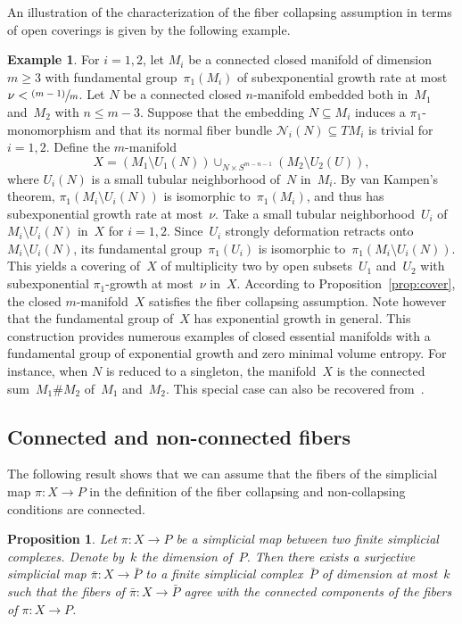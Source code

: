 \documentclass[11pt]{article}
\let\oldsfrac\sfrac
\renewcommand{\sfrac}[2]{{\oldsfrac{#1}{#2}}}
\newcommand{\psfrac}[2]{\sfrac{(#1)}{#2}}
\newtheorem{proposition}[theorem]{Proposition}
\theoremstyle{definition}
\newtheorem{example}[theorem]{Example}
\numberwithin{equation}{section}
\begin{document}
An illustration of the characterization of the fiber collapsing assumption in terms of open coverings is given by the following example.

\begin{example}
For $i=1,2$, let $M_i$ be a connected closed manifold of dimension~$m \geq 3$ with fundamental group~$\pi_1(M_i)$ of subexponential growth rate at most~$\nu < \psfrac{m-1}{m}$.
Let $N$ be a connected closed $n$-manifold embedded both in~$M_1$ and~$M_2$ with $n \leq m-3$.
Suppose that the embedding $N \subseteq M_i$ induces a $\pi_1$-monomorphism and that its normal fiber bundle $\mathcal{N}_i(N) \subseteq TM_i$ is trivial for $i=1,2$.
Define the $m$\nobreakdash-manifold
\[
X = (M_1 \setminus U_1(N)) \mathop{\cup}_{N \times S^{m-n-1}} (M_2 \setminus U_2(U)),
\]
where $U_i(N)$ is a small tubular neighborhood of~$N$ in~$M_i$.
By van Kampen's theorem, $\pi_1(M_i \setminus U_i(N))$ is isomorphic to~$\pi_1(M_i)$, and thus has subexponential growth rate at most~$\nu$.
Take a small tubular neighborhood~$U_i$ of~$M_i \setminus U_i(N)$ in~$X$ for $i=1,2$.
Since~$U_i$ strongly deformation retracts onto~$M_i \setminus U_i(N)$, its fundamental group~$\pi_1(U_i)$ is isomorphic to~$\pi_1(M_i \setminus U_i(N))$.
This yields a covering of~$X$ of multiplicity two by open subsets~$U_1$ and~$U_2$ with subexponential $\pi_1$-growth at most~$\nu$ in~$X$.
According to Proposition~\ref{prop:cover}, the closed $m$\nobreakdash-manifold~$X$ satisfies the fiber collapsing assumption.
Note however that the fundamental group of~$X$ has exponential growth in general.
This construction provides numerous examples of closed essential manifolds with a fundamental group of exponential growth and zero minimal volume entropy.
For instance, when $N$ is reduced to a singleton, the manifold~$X$ is the connected sum~$M_1 \# M_2$ of~$M_1$ and~$M_2$.
This special case can also be recovered from~\cite[Th.\,2.8]{BS}.
\end{example}

\subsection{Connected and non-connected fibers}

The following result shows that we can assume that the fibers of the simplicial map $\pi:X \to P$ in the definition of the fiber collapsing and non-collapsing conditions are connected.

\begin{proposition} \label{prop:connected}
Let $\pi:X \to P$ be a simplicial map between two finite simplicial complexes.
Denote by~$k$ the dimension of~$P$.
Then there exists a surjective simplicial map $\bar{\pi}:X \to \bar{P}$ to a finite simplicial complex~$\bar{P}$ of dimension at most~$k$ such that the fibers of $\bar{\pi}:X \to \bar{P}$ agree with the connected components of the fibers of $\pi:X \to P$.
\end{proposition}
\end{document}
